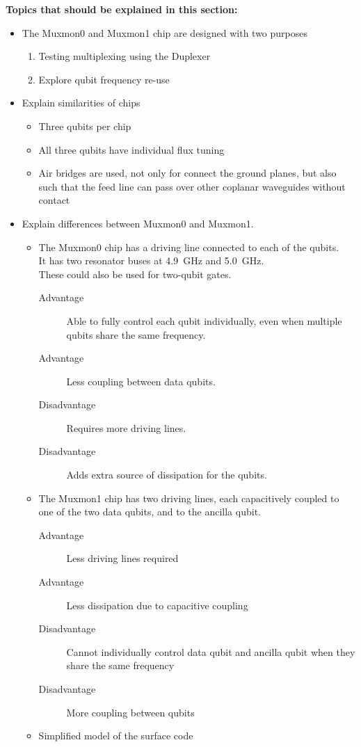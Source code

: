     \textbf{Topics that should be explained in this section:}
    \begin{itemize}
      \item The Muxmon0 and Muxmon1 chip are designed with two purposes
      \begin{enumerate}
        \item Testing multiplexing using the Duplexer
        \item Explore qubit frequency re-use
      \end{enumerate}

      \item Explain similarities of chips
      \begin{itemize}
        \item Three qubits per chip
        \item All three qubits have individual flux tuning
        \item Air bridges are used, not only for connect the ground planes, but also such that the feed line can pass over other coplanar waveguides without contact \\
      \end{itemize}

      \item Explain differences between Muxmon0 and Muxmon1.
      \begin{itemize}
        \item The Muxmon0 chip has a driving line connected to each of the qubits. \\
            It has two resonator buses at \SI{4.9}{\giga \hertz} and \SI{5.0}{\giga \hertz}. \\
            These could also be used for two-qubit gates.
        \begin{description}
          \item[Advantage] Able to fully control each qubit individually, even when multiple qubits share the same frequency.
          \item[Advantage] Less coupling between data qubits.
          \item[Disadvantage] Requires more driving lines.
          \item[Disadvantage] Adds extra source of dissipation for the qubits.
        \end{description}
        \item The Muxmon1 chip has two driving lines, each capacitively coupled to one of the two data qubits, and to the ancilla qubit.
        \begin{description}
          \item[Advantage] Less driving lines required
          \item[Advantage] Less dissipation due to capacitive coupling
          \item[Disadvantage] Cannot individually control data qubit and ancilla qubit when they share the same frequency
          \item[Disadvantage] More coupling between qubits
        \end{description}
        \item Simplified model of the surface code
      \end{itemize}


\end{itemize}
